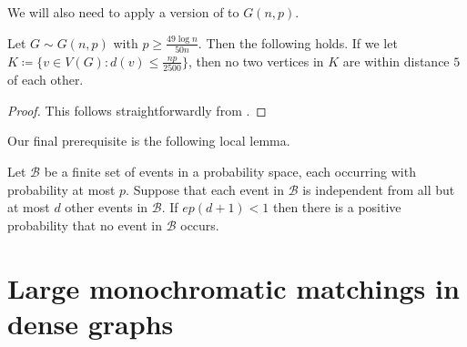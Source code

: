 \documentclass[10pt,a4paper,reqno]{amsart}
\begin{document}
We will also need to apply a version of  to $G(n,p)$.
\begin{corollary}\label{cor:small_deg_vertices}
    Let $G \sim G(n,p)$ with $p \ge \frac{49\log{n}}{50n}$. Then \whp the following holds. If we let ${K \coloneqq \{v \in V(G) : d(v) \le \frac{np}{2500}\}}$, then no two vertices in $K$ are within distance $5$ of each other.
\end{corollary}
\begin{proof}
    This follows straightforwardly from .
\end{proof}


Our final prerequisite is the following local lemma.
\begin{lemma}\label{lem:LLL} Let 
$\mathcal{B}$ be a finite set of events in a probability space, each occurring with probability at most $p$. Suppose that each event in $\mathcal{B}$ is independent from all but at most $d$ other events in $\mathcal{B}$. 
If $ep(d+1) < 1$ then there is a positive probability that no event in $\mathcal{B}$ occurs.
\end{lemma}


\bigskip \section{Large monochromatic matchings in dense graphs}\label{sec:mono matchings}
\end{document}
